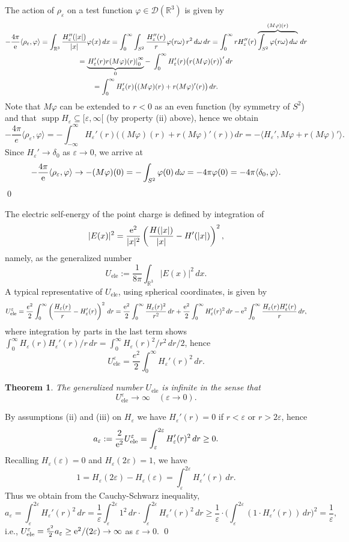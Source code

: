 \documentclass[sumlimits,intlimits,namelimits%
]{amsart}
\newcommand{\D}{\ensuremath{\mathcal{D}}}
\newcommand{\mb}[1]{\ensuremath{\mathbb{#1}}}
\newcommand{\R}{\mb{R}}
\newtheorem{theorem}{Theorem}[section]
\theoremstyle{definition}
\newcommand{\dis}[2]{\langle #1 , #2 \rangle}
\newcommand{\de}{\delta}
\newcommand{\eps}{\varepsilon}
\newcommand{\vphi}{\varphi}
\newcommand{\om}{\omega}
\newcommand{\supp}{\mathop{\mathrm{supp}}}
\newcommand{\e}{\textup{e}}
\newcommand{\Uel}{U_{\text{ele}}}
\begin{document}
\proof The action of $\rho_\eps$ on a test function $\vphi \in \D(\R^3)$ is given by
\begin{multline*}
  - \frac{4 \pi}{\e} \dis{\rho_\eps}{\vphi} =  \int_{\R^3} \frac{H_\eps''(|x|)}{|x|} \vphi(x) \, dx 
  = \int_0^\infty \int_{S^2} \frac{H_\eps''(r)}{r} \vphi(r \om) \, r^2 \, d\om \, d r
  = \int_0^\infty r H_\eps''(r) \overbrace{\int_{S^2} \vphi(r \om) \, d \om}^{(M \vphi)(r)} \, d r\\
  =  \underbrace{ \left.  H_\eps'(r) r  (M \vphi)(r)  \right|_0^\infty}_{0} 
  - \;    \int_0^\infty H_\eps'(r) \big( r (M\vphi)(r)\big)' \, dr\\ 
  =    \int_0^\infty H_\eps'(r) \big( (M\vphi)(r) + r (M\vphi)'(r) \big) \, dr.
\end{multline*}
Note that $M\vphi$ can be extended to $r < 0$ as an even function (by symmetry of $S^2$) and that $\supp H_\eps \subseteq [\eps,\infty[$ (by property (ii) above), hence we obtain
$$
   - \frac{4 \pi}{e} \dis{\rho_\eps}{\vphi} =  -  \int_{-\infty}^\infty H_\eps'(r) \big( (M\vphi)(r) + r (M\vphi)'(r) \big) \, dr
   = -  \dis{H_\eps'}{M\vphi + r (M\vphi)'}.
$$
Since $H_\eps' \to \de_0$ as $\eps \to 0$, we arrive at
$$
    - \frac{4 \pi}{\e} \dis{\rho_\eps}{\vphi} \to -  (M\vphi)(0) = - \int_{S^2} \vphi(0) \, d\om = 
    - 4 \pi \vphi(0) = - 4 \pi \dis{\de_0}{\vphi}.
$$
\qed

The electric self-energy of the point charge is defined by integration of 
$$
   |E(x)|^2 = \frac{\e^2}{|x|^2} \left( \frac{H(|x|)}{|x|} - H'(|x|) \right)^2,  
$$
namely, as the generalized number 
$$
   \Uel := \frac{1}{8 \pi} \int_{\R^3} |E(x)|^2 \, dx.
$$
A typical representative of $\Uel$, using spherical coordinates, is given by
$$
   \Uel^\eps = \frac{e^2}{2} \int_0^\infty \left( \frac{H_\eps(r)}{r} - H_\eps'(r)\right)^2 \, dr
   = \frac{\e^2}{2} \int_0^\infty \frac{H_\eps(r)^2}{r^2} \, dr  + 
   \frac{\e^2}{2} \int_0^\infty H_\eps'(r)^2 \, dr - 
   \e^2 \int_0^\infty \frac{H_\eps(r) H_\eps'(r)}{r}  \, dr,
$$
where integration by parts in the last term shows $ \int_0^\infty H_\eps(r) H_\eps'(r)/r  \, dr =  \int_0^\infty H_\eps(r)^2/r^2 \, dr/2$, hence
$$
    \Uel^\eps =  \frac{e^2}{2} \int_0^\infty H_\eps'(r)^2 \, dr.
$$

\begin{theorem}\label{UelThm} The generalized number $\Uel$ is infinite in the sense that
$$
   \Uel^\eps \to \infty \quad (\eps \to 0).
$$
\end{theorem}
\proof By assumptions (ii) and (iii) on $H_\eps$ we have $H_\eps' (r) = 0$ if $r < \eps$ or $r > 2 \eps$, hence
$$
 a_\eps : = \frac{2}{\e^2} \Uel^\eps = \int_\eps^{2 \eps} H_\eps'(r)^2 \, dr \geq 0.
$$ 
Recalling  $H_\eps(\eps) = 0$ and $H_\eps(2 \eps) = 1$, we have
$$
   1 = H_\eps(2 \eps)  - H_\eps(\eps) = \int_\eps^{2 \eps} H_\eps'(r) \, dr. 
$$
Thus we obtain from the Cauchy-Schwarz inequality,
$$
   a_\eps = \int_\eps^{2 \eps} H_\eps'(r)^2 \, dr = \frac{1}{\eps} \int_\eps^{2 \eps} 1^2 \, dr \cdot \int_\eps^{2 \eps} H_\eps'(r)^2 \, dr 
   \geq \frac{1}{\eps} \cdot \Big( \int_\eps^{2 \eps} (1 \cdot H_\eps'(r)) \, dr \Big)^2 = \frac{1}{\eps},
$$
i.e., $\Uel^\eps = \frac{e^2}{2} a_\eps  \geq \e^2/(2 \eps) \to \infty$ as $\eps \to 0$. \qed
\end{document}
